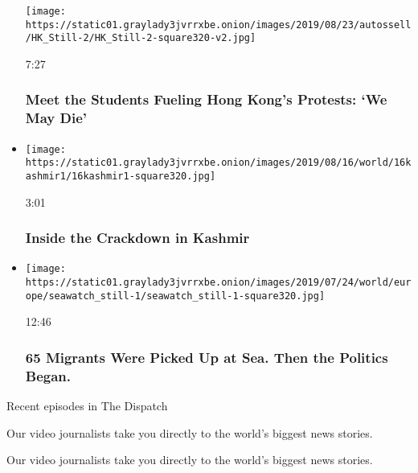 \begin{itemize}
  \texttt{[image: https://static01.graylady3jvrrxbe.onion/images/2019/08/23/autossell/HK\_Still-2/HK\_Still-2-square320-v2.jpg]}

  7:27

  \hypertarget{meet-the-students-fueling-hong-kongs-protests-we-may-die}{%
  \subsubsection{Meet the Students Fueling Hong Kong's Protests: `We May
  Die'}\label{meet-the-students-fueling-hong-kongs-protests-we-may-die}}
\item
  \href{https://www.nytimes3xbfgragh.onion/video/world/asia/100000006653817/kashmir-india-pakistan.html?action=click\&module=video-series-bar\&region=header\&pgtype=Article\&playlistId=video/on-the-ground}{}

  \texttt{[image: https://static01.graylady3jvrrxbe.onion/images/2019/08/16/world/16kashmir1/16kashmir1-square320.jpg]}

  3:01

  \hypertarget{inside-the-crackdown-in-kashmir}{%
  \subsubsection{Inside the Crackdown in
  Kashmir}\label{inside-the-crackdown-in-kashmir}}
\item
  \href{https://www.nytimes3xbfgragh.onion/video/world/europe/100000006498001/seawatch-migrants-europe.html?action=click\&module=video-series-bar\&region=header\&pgtype=Article\&playlistId=video/on-the-ground}{}

  \texttt{[image: https://static01.graylady3jvrrxbe.onion/images/2019/07/24/world/europe/seawatch\_still-1/seawatch\_still-1-square320.jpg]}

  12:46

  \hypertarget{65-migrants-were-picked-up-at-sea-then-the-politics-began}{%
  \subsubsection{65 Migrants Were Picked Up at Sea. Then the Politics
  Began.}\label{65-migrants-were-picked-up-at-sea-then-the-politics-began}}
\end{itemize}

Recent episodes in The Dispatch

Our video journalists take you directly to the world's biggest news
stories.

Our video journalists take you directly to the world's biggest news
stories.


